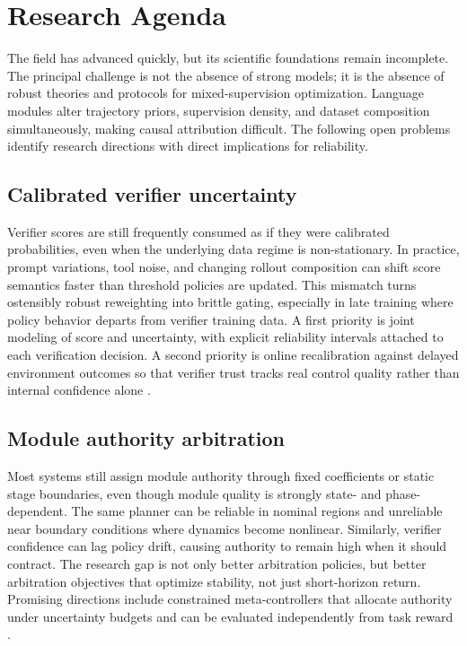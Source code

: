 ﻿\documentclass[conference]{IEEEtran}
\begin{document}
\section{Research Agenda}
The field has advanced quickly, but its scientific foundations remain incomplete. The principal challenge is not the absence of strong models; it is the absence of robust theories and protocols for mixed-supervision optimization. Language modules alter trajectory priors, supervision density, and dataset composition simultaneously, making causal attribution difficult. The following open problems identify research directions with direct implications for reliability.

\subsection{Calibrated verifier uncertainty}
Verifier scores are still frequently consumed as if they were calibrated probabilities, even when the underlying data regime is non-stationary. In practice, prompt variations, tool noise, and changing rollout composition can shift score semantics faster than threshold policies are updated. This mismatch turns ostensibly robust reweighting into brittle gating, especially in late training where policy behavior departs from verifier training data. A first priority is joint modeling of score and uncertainty, with explicit reliability intervals attached to each verification decision. A second priority is online recalibration against delayed environment outcomes so that verifier trust tracks real control quality rather than internal confidence alone \cite{arxiv_p_2602_06493,arxiv_p_2602_12579,arxiv_p_2602_02395}.

\subsection{Module authority arbitration}
Most systems still assign module authority through fixed coefficients or static stage boundaries, even though module quality is strongly state- and phase-dependent. The same planner can be reliable in nominal regions and unreliable near boundary conditions where dynamics become nonlinear. Similarly, verifier confidence can lag policy drift, causing authority to remain high when it should contract. The research gap is not only better arbitration policies, but better arbitration objectives that optimize stability, not just short-horizon return. Promising directions include constrained meta-controllers that allocate authority under uncertainty budgets and can be evaluated independently from task reward \cite{arxiv_p_2508_03680,arxiv_p_2601_16486,arxiv_p_2602_07906}.
\end{document}
